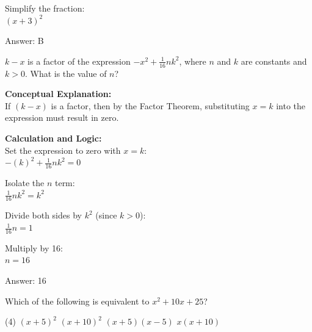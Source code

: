 \documentclass[11pt,paper=a4,answers]{exam}
\begin{document}
\begin{questions}
\begin{solution}
\vspace{10pt}

Simplify the fraction: \\
$(x+3)^2$

\vspace{25pt}

Answer: \colorbox{yellow!100}{B}
\end{solution}

\vspace{40pt}

\question
$k - x$ is a factor of the expression $-x^2 + \frac{1}{16}nk^2$, where $n$ and $k$ are constants and $k > 0$. What is the value of $n$?

\begin{solution}
\textbf{Conceptual Explanation:} \\
If $(k-x)$ is a factor, then by the Factor Theorem, substituting $x=k$ into the expression must result in zero.

\vspace{20pt}

\textbf{Calculation and Logic:} \\
Set the expression to zero with $x=k$: \\
$-(k)^2 + \frac{1}{16}nk^2 = 0$

\vspace{10pt}

Isolate the $n$ term: \\
$\frac{1}{16}nk^2 = k^2$

\vspace{10pt}

Divide both sides by $k^2$ (since $k > 0$): \\
$\frac{1}{16}n = 1$

\vspace{10pt}

Multiply by 16: \\
$n = 16$

\vspace{25pt}

Answer: \colorbox{yellow!100}{16}
\end{solution}

\vspace{40pt}

\question
Which of the following is equivalent to $x^2 + 10x + 25$?
\begin{tasks}(4)
    \task $(x+5)^2$
    \task $(x+10)^2$
    \task $(x+5)(x-5)$
    \task $x(x+10)$
\end{tasks}


\end{questions}
\end{document}
